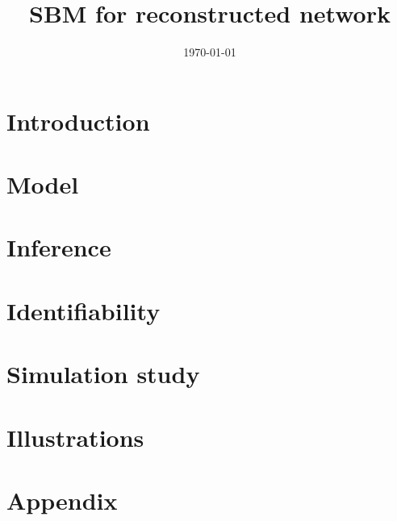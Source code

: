 \documentclass[a4paper]{article}
\begin{document}
\title{SBM for reconstructed network}

\author{} 

\date{\today}
\maketitle

\tableofcontents

\newpage \section{Introduction}

\newpage \section{Model}


\newpage \section{Inference}


\newpage \section{Identifiability}

\newpage \section{Simulation study}


\newpage \section{Illustrations}





\appendix

\newpage \section{Appendix}


\end{document}
